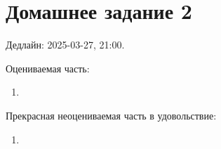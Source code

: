 \documentclass[12pt]{article}
\begin{document}
\section*{Домашнее задание 2}

Дедлайн: 2025-03-27, 21:00.

Оцениваемая часть:

\begin{enumerate}
\item 
\end{enumerate}

Прекрасная неоцениваемая часть в удовольствие:

\begin{enumerate}
    \item 
\end{enumerate}
\end{document}
